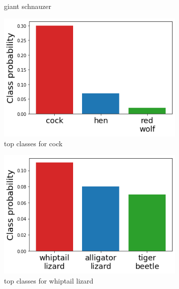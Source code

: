 \documentclass[10pt,twocolumn,letterpaper]{article}
\begin{document}
\begin{figure}
\begin{subfigure}[t]{0.3\linewidth}
        \caption*{giant schnauzer}
    \end{subfigure}
    \begin{subfigure}[t]{0.4\linewidth}\centering
        \includegraphics[width=\textwidth]{images/cock.png}
        \caption*{top classes for cock}
    \end{subfigure}\hspace{0.04\textwidth}
    \begin{subfigure}[t]{0.4\linewidth}\centering
        \includegraphics[width=\textwidth]{images/lizard.png}
        \caption*{top classes for whiptail lizard}
    \end{subfigure}\hspace{0.04\textwidth}
    \begin{subfigure}[t]{0.4\linewidth}\centering

\end{subfigure}
\end{figure}
\end{document}
